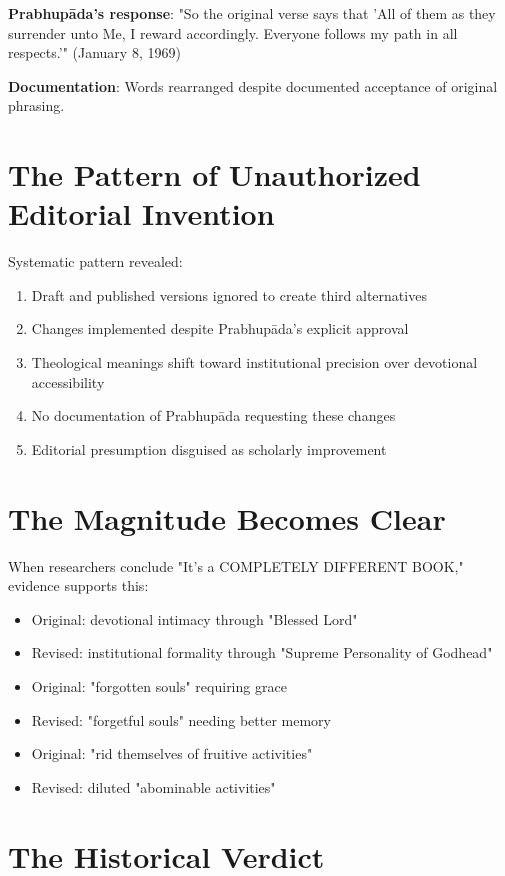 \documentclass[11pt,twoside]{book}
\begin{document}
\textbf{\textbf{Prabhupāda's response}}: "So the original verse says that 'All of them as they surrender unto Me, I reward accordingly. Everyone follows my path in all respects.'" (January 8, 1969)

\textbf{\textbf{Documentation}}: Words rearranged despite documented acceptance of original phrasing.
\section*{The Pattern of Unauthorized Editorial Invention}
\label{sec:org4965674}

Systematic pattern revealed:
\begin{enumerate}
\item Draft and published versions ignored to create third alternatives
\item Changes implemented despite Prabhupāda's explicit approval
\item Theological meanings shift toward institutional precision over devotional accessibility
\item No documentation of Prabhupāda requesting these changes
\item Editorial presumption disguised as scholarly improvement
\end{enumerate}
\section*{The Magnitude Becomes Clear}
\label{sec:orgf3723cf}

When researchers conclude "It's a COMPLETELY DIFFERENT BOOK," evidence supports this:

\begin{itemize}
\item Original: devotional intimacy through "Blessed Lord"
\item Revised: institutional formality through "Supreme Personality of Godhead"
\item Original: "forgotten souls" requiring grace
\item Revised: "forgetful souls" needing better memory
\item Original: "rid themselves of fruitive activities"
\item Revised: diluted "abominable activities"
\end{itemize}
\section*{The Historical Verdict}
\label{sec:org1e65731}
\end{document}
